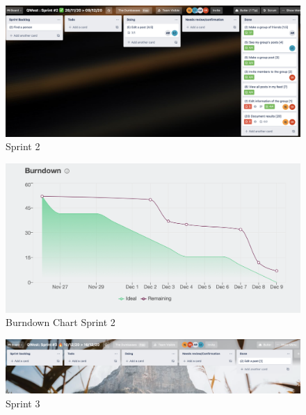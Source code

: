\begin{figure}
    \includegraphics[width=\linewidth]{figures/Sprint 2.png}
    \caption{Sprint 2}
    \label{fig:Sp2}
\end{figure}



\begin{figure}
    \includegraphics[width=\linewidth]{figures/Sprint 2 Burndown.png}
    \caption{Burndown Chart Sprint 2}
    \label{fig:Bc2}
\end{figure}

\begin{figure}
    \includegraphics[width=\linewidth]{figures/Sprint 3 .png}
    \caption{{Sprint 3}}
    \label{fig:Sp3}
\end{figure}




